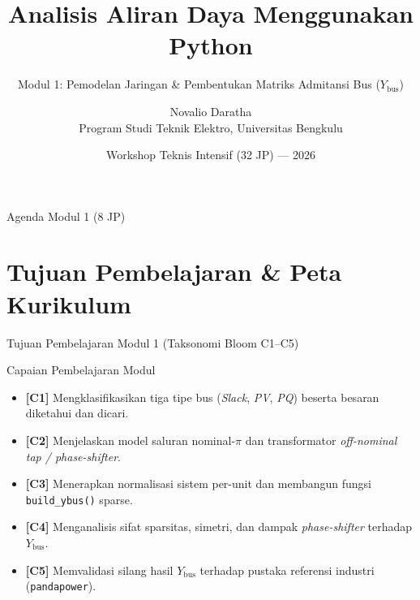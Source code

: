 \documentclass[aspectratio=169,10pt]{beamer}
\title[Aliran Daya Python — Modul 1]{Analisis Aliran Daya Menggunakan Python}
\subtitle{Modul 1: Pemodelan Jaringan \& Pembentukan Matriks Admitansi Bus ($Y_{\text{bus}}$)}
\author[Novalio Daratha]{Novalio Daratha\\Program Studi Teknik Elektro, Universitas Bengkulu}
\date{Workshop Teknis Intensif (32 JP) — 2026}
\begin{document}
\begin{frame}
  \titlepage
\end{frame}

\begin{frame}{Agenda Modul 1 (8 JP)}
  \tableofcontents
\end{frame}

\section{Tujuan Pembelajaran \& Peta Kurikulum}

\begin{frame}{Tujuan Pembelajaran Modul 1 (Taksonomi Bloom C1--C5)}
  \begin{block}{Capaian Pembelajaran Modul}
    \begin{itemize}
      \item \textbf{[C1]} Mengklasifikasikan tiga tipe bus (\textit{Slack}, \textit{PV}, \textit{PQ}) beserta besaran diketahui dan dicari.
      \item \textbf{[C2]} Menjelaskan model saluran nominal-$\pi$ dan transformator \textit{off-nominal tap / phase-shifter}.
      \item \textbf{[C3]} Menerapkan normalisasi sistem per-unit dan membangun fungsi \texttt{build\_ybus()} sparse.
      \item \textbf{[C4]} Menganalisis sifat sparsitas, simetri, dan dampak \textit{phase-shifter} terhadap $Y_{\text{bus}}$.
      \item \textbf{[C5]} Memvalidasi silang hasil $Y_{\text{bus}}$ terhadap pustaka referensi industri (\texttt{pandapower}).
    \end{itemize}
  \end{block}
  \vspace{0.2cm}
  \begin{center}
  \end{center}
\end{frame}
\end{document}
